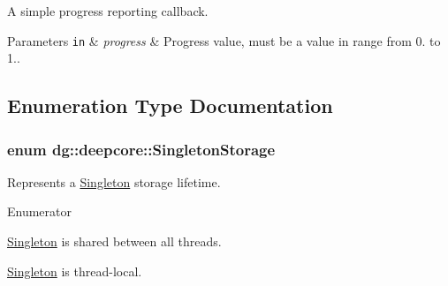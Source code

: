 A simple progress reporting callback. 


\begin{DoxyParams}[1]{Parameters}
\mbox{\tt in}  & {\em progress} & Progress value, must be a value in range from 0. to 1.. \\
\hline
\end{DoxyParams}


\subsection{Enumeration Type Documentation}
\subsubsection[{\texorpdfstring{Singleton\+Storage}{SingletonStorage}}]{\setlength{\rightskip}{0pt plus 5cm}enum {\bf dg\+::deepcore\+::\+Singleton\+Storage}\hspace{0.3cm}{\ttfamily [strong]}}\hypertarget{group___utility_module_ga77a5aca6f6f331cac011e7759117ddcb}{}\label{group___utility_module_ga77a5aca6f6f331cac011e7759117ddcb}


Represents a \hyperlink{classdg_1_1deepcore_1_1_singleton}{Singleton} storage lifetime. 

\begin{Desc}
\item[Enumerator]\par
\begin{description}
\item[{\em 
G\+L\+O\+B\+AL\hypertarget{group___utility_module_gga77a5aca6f6f331cac011e7759117ddcba6eecfba72d12922ee1dead07a0ef3334}{}\label{group___utility_module_gga77a5aca6f6f331cac011e7759117ddcba6eecfba72d12922ee1dead07a0ef3334}
}]\hyperlink{classdg_1_1deepcore_1_1_singleton}{Singleton} is shared between all threads. \item[{\em 
T\+H\+R\+E\+A\+D\+\_\+\+L\+O\+C\+AL\hypertarget{group___utility_module_gga77a5aca6f6f331cac011e7759117ddcba772a52ee176003ef0c6cef7830da4ffe}{}\label{group___utility_module_gga77a5aca6f6f331cac011e7759117ddcba772a52ee176003ef0c6cef7830da4ffe}
}]\hyperlink{classdg_1_1deepcore_1_1_singleton}{Singleton} is thread-\/local. \end{description}
\end{Desc}


